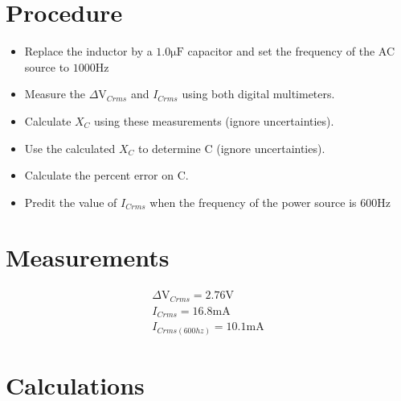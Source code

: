 \documentclass{report}
\begin{document}
\section{Procedure}

\begin{itemize}
    \item Replace the inductor by a $1.0\si{\micro\farad}$ capacitor and set the frequency of the AC source to $1000\si{\hertz}$
    \item Measure the $\Delta\si{\volt}_{Crms}$ and $I_{Crms}$ using both digital multimeters.
    \item Calculate $X_{C}$ using these measurements (ignore uncertainties).
    \item Use the calculated $X_{C}$ to determine C (ignore uncertainties).
    \item Calculate the percent error on C.
    \item Predit the value of $I_{Crms}$ when the frequency of the power source is $600\si{\hertz}$ 
\end{itemize}

\section{Measurements}

\begin{gather}
    \Delta\si{\volt}_{Crms}=2.76\si{\volt}\\
    I_{Crms}=16.8\si{\milli\ampere}\\
    I_{Crms(600hz)}=10.1\si{\milli\ampere}
\end{gather}

\section{ Calculations}
\end{document}
